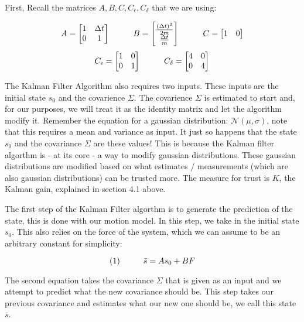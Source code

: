 \documentclass[11pt]{article}
\begin{document}
First, Recall the matrices $A,B,C,C_{\epsilon},C_{\delta} $  that we are using:

\[
A =
\begin{bmatrix}
1 & \Delta t\\
0 & 1
\end{bmatrix}
\hspace{10mm}
B =
\begin{bmatrix}
\frac{(\Delta t)^2}{2m}\\
\frac{\Delta t}{m}
\end{bmatrix}
\hspace{10mm}
C =
\begin{bmatrix}
  1 & 0
\end{bmatrix}
\]
\[
C_{\epsilon} =
\begin{bmatrix}
1 & 0 \\
0 & 1
\end{bmatrix}
\hspace{10mm}
C_{\delta} =
\begin{bmatrix}
4 & 0 \\
0 & 4
\end{bmatrix}
\]

The Kalman Filter Algorithm also requires two inputs. These inputs are the initial
state $s_0$ and the covarience $\Sigma$. The covarience $\Sigma$ is estimated to start
and, for our purposes, we will treat it as the identity matrix and let the algorithm
modify it. Remember the equation for a gaussian distribution: $\mathcal{N}(\mu, \sigma)$,
note that this requires a mean and variance as input. It just so happens that the state
$s_0$ and the covariance $\Sigma$ are these values! This is because the Kalman filter
algorthm is - at its core - a way to modify gaussian distributions. These gaussian distributions
are modified based on what estimates / measurements (which are also gaussian distributions)
can be trusted more. The measure for trust is $K$, the Kalman gain, explained in
section 4.1 above.

The first step of the Kalman Filter algorthm is to generate the prediction of the
state, this is done with our motion model. In this step, we take in the initial state
$s_0$. This also relies on the force of the system, which we can assume to be an
arbitrary constant for simplicity:

\[
(1) \hspace{10mm} \bar{s} = A s_0 + B F
\]

The second equation takes the covariance $\Sigma$ that is given as an input and we
attempt to predict what the new covariance should be. This step takes our previous
covariance and estimates what our new one should be, we call this state $\bar{s}$.
\end{document}
